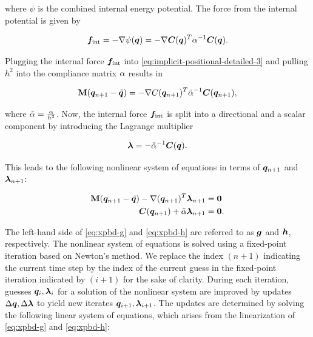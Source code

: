 \noindent where $\psi$ is the combined internal energy potential. The force from the internal potential is given by

\begin{equation}\label{eq:xpbd-internal-force}
    \bm{f}_{\text{int}} = -\nabla \psi(\bm{q}) = -\nabla \bm{C}(\bm{q})^T \mathbf{\alpha}^{-1} \bm{C}(\bm{q}).
\end{equation}

\noindent Plugging the internal force $\bm{f}_{\text{int}}$ into \autoref{eq:implicit-positional-detailed-3} and pulling $h^2$ into the 
compliance matrix $\mathbf{\alpha}$ results in

\[
    \mathbf{M}(\bm{q}_{n+1} - \tilde{\bm{q}}) = - \nabla C(\bm{q}_{n+1})^T \tilde{\mathbf{\alpha}}^{-1} \bm{C}(\bm{q}_{n+1}),
\]

\noindent where $\tilde{\mathbf{\alpha}} = \frac{\mathbf{\alpha}}{h^2}$. Now, the internal force $\bm{f}_{\text{int}}$ is split into a directional 
and a scalar component by introducing the Lagrange multiplier

\begin{equation}\label{eq:lagrange-multiplier}
    \bm{\lambda} = -\tilde{\mathbf{\alpha}}^{-1}\bm{C}(\bm{q}).
\end{equation}

\noindent This leads to the following nonlinear system of equations in terms of $\bm{q}_{n+1}$ and $\bm{\lambda}_{n+1}$:

\begin{align}
    \mathbf{M}(\bm{q}_{n+1} - \tilde{\bm{q}}) - \nabla (\bm{q}_{n+1})^T \bm{\lambda}_{n+1} &= \bm{0} \label{eq:xpbd-g} \\
    \bm{C}(\bm{q}_{n+1}) + \tilde{\mathbf{\alpha}}\bm{\lambda}_{n+1} &= \bm{0} \label{eq:xpbd-h}.
\end{align}

\noindent The left-hand side of \autoref{eq:xpbd-g} and \autoref{eq:xpbd-h} are referred to as $\bm{g}$ and $\bm{h}$, respectively. The nonlinear 
system of equations is solved using a fixed-point iteration based on Newton's method. We replace the index $(n+1)$ indicating the current
time step by the index of the current guess in the fixed-point iteration indicated by $(i+1)$ for the sake of clarity. During each iteration, 
guesses $\bm{q}_i, \bm{\lambda}_i$ for a solution of the nonlinear system are improved by updates $\Delta \bm{q}, \Delta \bm{\lambda}$ to 
yield new iterates $\bm{q}_{i+1}, \bm{\lambda}_{i+1}$. The updates are determined by solving the following linear system of equations, 
which arises from the linearization of \autoref{eq:xpbd-g} and \autoref{eq:xpbd-h}:

